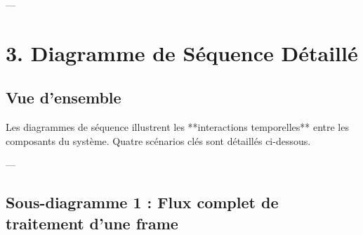 ---

\newpage
\section{3. Diagramme de Séquence Détaillé}

\subsection{Vue d'ensemble}

Les diagrammes de séquence illustrent les **interactions temporelles** entre les composants du système. Quatre scénarios clés sont détaillés ci-dessous.

---

\subsection{Sous-diagramme 1 : Flux complet de traitement d'une frame}

